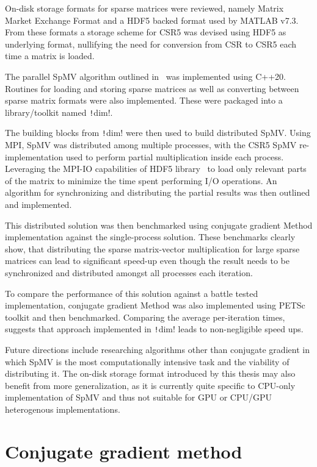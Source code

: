 \documentclass[thesis=M,english]{FITthesis}[2019/12/23]
\newcommand{\csre}[1]{\texttt!#1!}
\begin{document}
On-disk storage formats for sparse matrices were reviewed, namely Matrix Market Exchange Format
and a HDF5 backed format used by MATLAB v7.3. From these formats a storage scheme for CSR5 was devised
using HDF5 as underlying format, nullifying the need for conversion from CSR to CSR5 each time a matrix
is loaded.

The parallel SpMV algorithm outlined in~\cite{liu2015csr5} was implemented using C++20. Routines for
loading and storing sparse matrices as well as converting between sparse matrix formats were
also implemented. These were packaged into a library/toolkit named \csre{dim}.

The building blocks from \csre{dim} were then used to build distributed SpMV\@. Using MPI, SpMV was
distributed among multiple processes, with the CSR5 SpMV re-implementation used to perform partial
multiplication inside each process. Leveraging the MPI-IO capabilities of HDF5 library~\cite{hdf5} to load only
relevant parts of the matrix to minimize the time spent performing I/O operations. An algorithm for
synchronizing and distributing the partial results was then outlined and implemented.

This distributed solution was then benchmarked using conjugate gradient Method implementation against the
single-process solution. These benchmarks clearly show, that distributing the sparse matrix-vector multiplication
for large sparse matrices can lead to significant speed-up even though the result needs to be synchronized
and distributed amongst all processes each iteration.

To compare the performance of this solution against a battle tested implementation, conjugate gradient Method
was also implemented using PETSc toolkit and then benchmarked. Comparing the average per-iteration times,
suggests that approach implemented in \csre{dim} leads to non-negligible speed ups.

Future directions include researching algorithms other than conjugate gradient in which SpMV is the
most computationally intensive task and the viability of distributing it. The on-disk storage format
introduced by this thesis may also benefit from more generalization, as it is currently quite specific to
CPU-only implementation of SpMV and thus not suitable for GPU or CPU/GPU heterogenous implementations.





\appendix


\chapter{Conjugate gradient method}\label{app:cg}
\end{document}
